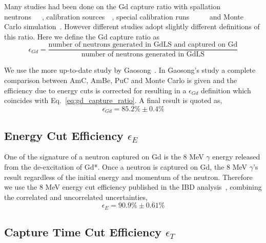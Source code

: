 \documentclass[paper=a4, fontsize=12pt, toc=left]{scrartcl} %
\numberwithin{equation}{section} %
\numberwithin{figure}{section} %
\numberwithin{table}{section} %
\begin{document}
Many studies had been done on the Gd capture ratio with spallation neutrons~\cite{docdb7273}~\cite{docdb7524}~\cite{docdb7525}, calibration sources~\cite{docdb7273}~\cite{docdb7525}, special calibration runs~\cite{docdb8280}~\cite{docdb8473}~\cite{docdb8501}~\cite{docdb9226}~\cite{docdb9273} and Monte Carlo simulation~\cite{docdb7730}. However different studies adopt slightly different definitions of this ratio. Here we define the Gd capture ratio as
\begin{equation} \label{eq:gd_capture_ratio}
	\epsilon_{Gd}=\frac{\text{number of neutrons generated in GdLS and captured on Gd}}{\text{number of neutrons generated in GdLS}}
\end{equation}

We use the more up-to-date study by Gaosong~\cite{docdb9273}. In Gaosong's study a complete comparison between AmC, AmBe, PuC and Monte Carlo is given and the efficiency due to energy cuts is corrected for resulting in a $\epsilon_{Gd}$ definition which coincides with Eq.~\ref{eq:gd_capture_ratio}. A final result is quoted as,
\begin{equation}
  \epsilon_{Gd}=85.2\%\pm 0.4\%
\end{equation}


\subsection{Energy Cut Efficiency \texorpdfstring{$\epsilon_{E}$}{epsilon E}}

One of the signature of a neutron captured on Gd is the 8 MeV $\gamma$ energy released from the de-excitation of Gd*. Once a neutron is captured on Gd, the 8 MeV $\gamma$'s result regardless of the initial energy and momentum of the neutron. Therefore we use the 8 MeV energy cut efficiency published in the IBD analysis~\cite{dayabay2012_1}, combining the correlated and uncorrelated uncertainties,
\begin{equation}
	\epsilon_{E}=90.9\%\pm 0.61\%
\end{equation}


\subsection{Capture Time Cut Efficiency \texorpdfstring{$\epsilon_{T}$}{epsilon T}}
\end{document}
